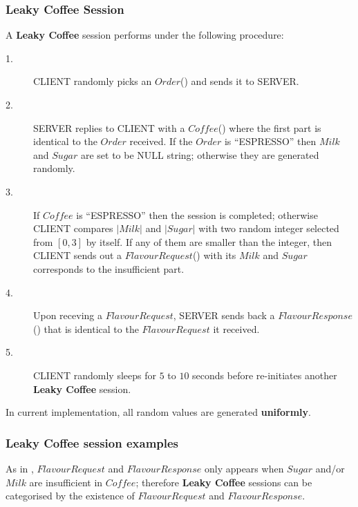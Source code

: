 
\begin{definition} \label{Def: Leaky Coffee Session}
\subsubsection{Leaky Coffee Session}
A \textbf{Leaky Coffee} session performs under the following procedure:

\begin{description}
\item[1.] CLIENT randomly picks an $Order$() and sends it to SERVER.

\item[2.] SERVER replies to CLIENT with a $Coffee$() where the first part is identical to the $Order$ received. If the $Order$ is “ESPRESSO” then $Milk$ and $Sugar$ are set to be NULL string; otherwise they are generated randomly.

\item[3.] If $Coffee$ is “ESPRESSO” then the session is completed; otherwise CLIENT compares $|Milk|$ and $|Sugar|$ with two random integer selected from $[0,3]$ by itself. If any of them are smaller than the integer, then CLIENT sends out a $FlavourRequest$() with its $Milk$ and $Sugar$ corresponds to the insufficient part.

\item[4.] Upon receving a $FlavourRequest$, SERVER sends back a $FlavourResponse$() that is identical to the $FlavourRequest$ it received.

\item[5.] CLIENT randomly sleeps for $5$ to $10$ seconds before re-initiates another \textbf{Leaky Coffee} session.
\end{description}
In current implementation, all random values are generated \textbf{uniformly}.
\end{definition}

\subsubsection{Leaky Coffee session examples}
As in , $FlavourRequest$ and $FlavourResponse$ only appears when $Sugar$ and/or $Milk$ are insufficient in $Coffee$; therefore \textbf{Leaky Coffee} sessions can be categorised by the existence of $FlavourRequest$ and $FlavourResponse$.

